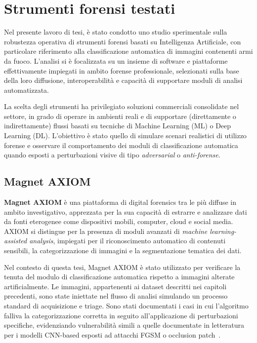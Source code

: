 \section{Strumenti forensi testati} \label{chap:strumenti}

Nel presente lavoro di tesi, è stato condotto uno studio sperimentale sulla robustezza operativa di strumenti forensi basati su Intelligenza Artificiale, con particolare riferimento alla classificazione automatica di immagini contenenti armi da fuoco. L’analisi si è focalizzata su un insieme di software e piattaforme effettivamente impiegati in ambito forense professionale, selezionati sulla base della loro diffusione, interoperabilità e capacità di supportare moduli di analisi automatizzata.

La scelta degli strumenti ha privilegiato soluzioni commerciali consolidate nel settore, in grado di operare in ambienti reali e di supportare (direttamente o indirettamente) flussi basati su tecniche di Machine Learning (ML) o Deep Learning (DL). L’obiettivo è stato quello di simulare scenari realistici di utilizzo forense e osservare il comportamento dei moduli di classificazione automatica quando esposti a perturbazioni visive di tipo \textit{adversarial} o \textit{anti-forense}.

\subsection{Magnet AXIOM}

\textbf{Magnet AXIOM} è una piattaforma di digital forensics tra le più diffuse in ambito investigativo, apprezzata per la sua capacità di estrarre e analizzare dati da fonti eterogenee come dispositivi mobili, computer, cloud e social media. AXIOM si distingue per la presenza di moduli avanzati di \textit{machine learning-assisted analysis}, impiegati per il riconoscimento automatico di contenuti sensibili, la categorizzazione di immagini e la segmentazione tematica dei dati.

Nel contesto di questa tesi, Magnet AXIOM è stato utilizzato per verificare la tenuta del modulo di classificazione automatica rispetto a immagini alterate artificialmente. Le immagini, appartenenti ai dataset descritti nei capitoli precedenti, sono state iniettate nel flusso di analisi simulando un processo standard di acquisizione e triage. Sono stati documentati i casi in cui l’algoritmo falliva la categorizzazione corretta in seguito all’applicazione di perturbazioni specifiche, evidenziando vulnerabilità simili a quelle documentate in letteratura per i modelli CNN-based esposti ad attacchi FGSM o occlusion patch~\cite{phd_unisi_068552}.


